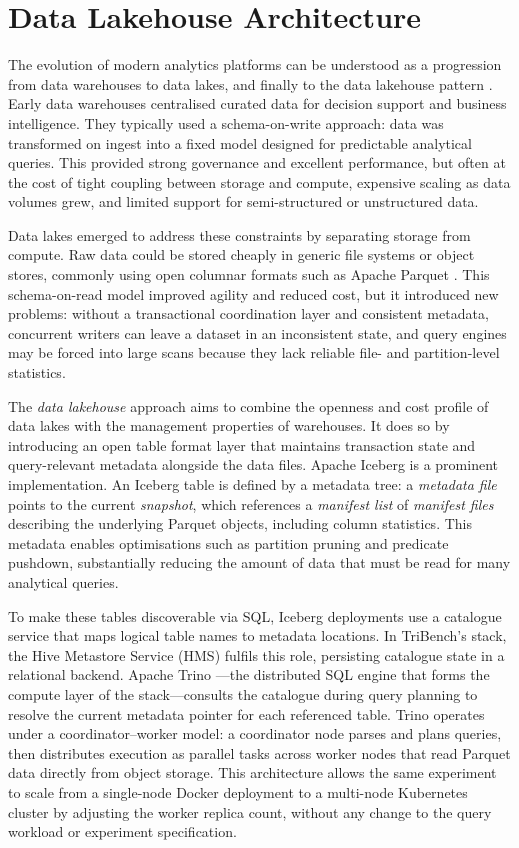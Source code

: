 \documentclass{l4proj}
\begin{document}
\section{Data Lakehouse Architecture}
\label{sec:lakehouse_arch}

The evolution of modern analytics platforms can be understood as a progression from data warehouses to data lakes, and finally to the data lakehouse pattern \citep{armbrust2021lakehouse}. Early data warehouses centralised curated data for decision support and business intelligence. They typically used a schema-on-write approach: data was transformed on ingest into a fixed model designed for predictable analytical queries. This provided strong governance and excellent performance, but often at the cost of tight coupling between storage and compute, expensive scaling as data volumes grew, and limited support for semi-structured or unstructured data.

Data lakes emerged to address these constraints by separating storage from compute. Raw data could be stored cheaply in generic file systems or object stores, commonly using open columnar formats such as Apache Parquet \citep{vohra2016apache}. This schema-on-read model improved agility and reduced cost, but it introduced new problems: without a transactional coordination layer and consistent metadata, concurrent writers can leave a dataset in an inconsistent state, and query engines may be forced into large scans because they lack reliable file- and partition-level statistics.

The \emph{data lakehouse} approach aims to combine the openness and cost profile of data lakes with the management properties of warehouses. It does so by introducing an open table format layer that maintains transaction state and query-relevant metadata alongside the data files. Apache Iceberg \citep{apache_iceberg} is a prominent implementation. An Iceberg table is defined by a metadata tree: a \emph{metadata file} points to the current \emph{snapshot}, which references a \emph{manifest list} of \emph{manifest files} describing the underlying Parquet objects, including column statistics. This metadata enables optimisations such as partition pruning and predicate pushdown, substantially reducing the amount of data that must be read for many analytical queries.

To make these tables discoverable via SQL, Iceberg deployments use a catalogue service that maps logical table names to metadata locations. In TriBench's stack, the Hive Metastore Service (HMS) fulfils this role, persisting catalogue state in a relational backend. Apache Trino \citep{sethi2019presto}---the distributed SQL engine that forms the compute layer of the stack---consults the catalogue during query planning to resolve the current metadata pointer for each referenced table. Trino operates under a coordinator--worker model: a coordinator node parses and plans queries, then distributes execution as parallel tasks across worker nodes that read Parquet data directly from object storage. This architecture allows the same experiment to scale from a single-node Docker deployment to a multi-node Kubernetes cluster by adjusting the worker replica count, without any change to the query workload or experiment specification.
\end{document}
